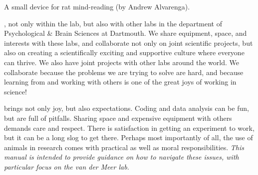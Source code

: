 \documentclass{tufte-book}
\begin{document}
\begin{marginfigure}[3cm]
\caption{A small device for rat mind-reading (by Andrew Alvarenga).}
\label{fig:8tt_drive}
\end{marginfigure}

, not only within the
lab, but also with other labs in the department of Psychological \&
Brain Sciences at Dartmouth. We share equipment, space, and interests
with these labs, and collaborate not only on joint scientific
projects, but also on creating a scientifically exciting and
supportive culture where everyone can thrive. We also have joint
projects with other labs around the world. We collaborate because the
problems we are trying to solve are hard, and because learning from
and working with others is one of the great joys of working in
science!

 brings not only joy, but also
expectations. Coding and data analysis can be fun, but are full of
pitfalls. Sharing space and expensive equipment with others demands
care and respect. There is satisfaction in getting an experiment to
work, but it can be a long slog to get there. Perhaps most importantly
of all, the use of animals in research comes with practical as well as
moral responsibilities. {\it This manual is intended to provide
  guidance on how to navigate these issues, with particular focus on
  the van der Meer lab.}
\end{document}
